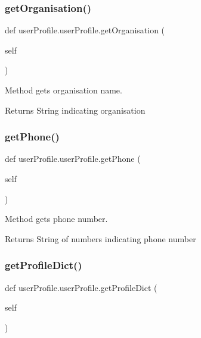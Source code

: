 \subsubsection{\texorpdfstring{get\+Organisation()}{getOrganisation()}}
{\footnotesize\ttfamily def user\+Profile.\+user\+Profile.\+get\+Organisation (\begin{DoxyParamCaption}\item[{}]{self }\end{DoxyParamCaption})}



Method gets organisation name. 

\begin{DoxyReturn}{Returns}
String indicating organisation 
\end{DoxyReturn}
\mbox{\label{classuserProfile_1_1userProfile_ac6014db8a44e3e1ea44d30a2dbeb2b25}} 
\subsubsection{\texorpdfstring{get\+Phone()}{getPhone()}}
{\footnotesize\ttfamily def user\+Profile.\+user\+Profile.\+get\+Phone (\begin{DoxyParamCaption}\item[{}]{self }\end{DoxyParamCaption})}



Method gets phone number. 

\begin{DoxyReturn}{Returns}
String of numbers indicating phone number 
\end{DoxyReturn}
\mbox{\label{classuserProfile_1_1userProfile_adb914cd59899ee5fc36c23be7f2219d0}} 
\subsubsection{\texorpdfstring{get\+Profile\+Dict()}{getProfileDict()}}
{\footnotesize\ttfamily def user\+Profile.\+user\+Profile.\+get\+Profile\+Dict (\begin{DoxyParamCaption}\item[{}]{self }\end{DoxyParamCaption})}



